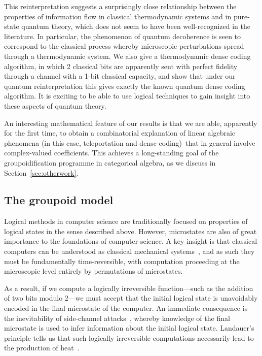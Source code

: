 \documentclass[a4paper,12pt]{article}
\theoremstyle{definition}
\renewcommand{\-}[0]{\nobreakdash-\hspace{0pt}}
\begin{document}
This reinterpretation suggests a surprisingly close relationship between the properties of information flow in classical thermodynamic systems and in pure-state quantum theory, which does not seem to have been well-recognized in the literature. In particular, the phenomenon of quantum decoherence is seen to correspond to the classical process whereby microscopic perturbations spread through a thermodynamic system. We also give a thermodynamic dense coding algorithm, in which 2 classical bits are apparently sent with perfect fidelity through a channel with a 1-bit classical capacity, and show that under our quantum reinterpretation this gives exactly the known quantum dense coding algorithm. It is exciting to be able to use logical techniques to gain insight into these aspects of quantum theory.

An interesting mathematical feature of our results is that we are able, apparently for the first time, to obtain a combinatorial explanation of linear algebraic phenomena (in this case, teleportation and dense coding)\ that in general involve complex-valued coefficients. This achieves a long-standing goal of the groupoidification programme in categorical algebra, as we discuss in Section~\ref{sec:otherwork}.




\subsection{The groupoid model}
\label{sec:groupoidmodel}

\noindent
Logical methods in computer science are traditionally focused on properties of logical states in the sense described above. However, microstates are also of great importance to the foundations of computer science. A key insight is that classical computers can be understood as classical mechanical systems~\cite{fredkintoffoli}, and as such they must be fundamentally time-reversible, with computation proceeding at the microscopic level entirely by  permutations of microstates.

As a result, if we compute a logically irreversible function---such as the addition of two bits modulo 2---we must accept that the initial logical state is unavoidably encoded in the final microstate of the computer. An immediate consequence is the  inevitability of side-channel attacks~\cite{malacaria}, whereby knowledge of the final microstate is used to infer information about the initial logical state. Landauer's principle tells us that such logically irreversible computations necessarily lead to the production of heat~\cite{ladyman-groisman, l61-dhg}.
\end{document}
